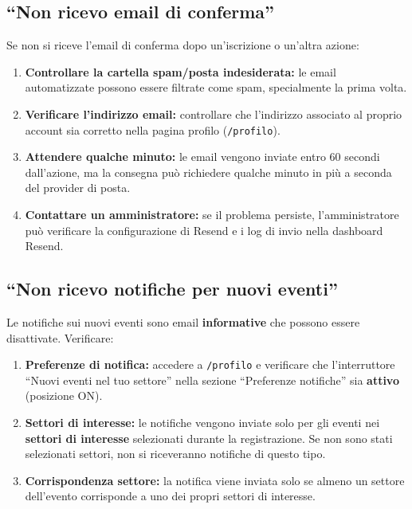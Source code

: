 \documentclass[a4paper,11pt,oneside]{book}
\newcommand{\percorso}[1]{\textcolor{namoCyan}{\texttt{#1}}}
\begin{document}
\subsection{``Non ricevo email di conferma''}

Se non si riceve l'email di conferma dopo un'iscrizione o un'altra azione:

\begin{enumerate}[leftmargin=1.5em]
  \item \textbf{Controllare la cartella spam/posta indesiderata:} le email automatizzate possono essere filtrate come spam, specialmente la prima volta.
  \item \textbf{Verificare l'indirizzo email:} controllare che l'indirizzo associato al proprio account sia corretto nella pagina profilo (\percorso{/profilo}).
  \item \textbf{Attendere qualche minuto:} le email vengono inviate entro 60 secondi dall'azione, ma la consegna pu\`o richiedere qualche minuto in pi\`u a seconda del provider di posta.
  \item \textbf{Contattare un amministratore:} se il problema persiste, l'amministratore pu\`o verificare la configurazione di Resend e i log di invio nella dashboard Resend.
\end{enumerate}

\subsection{``Non ricevo notifiche per nuovi eventi''}

Le notifiche sui nuovi eventi sono email \textbf{informative} che possono essere disattivate. Verificare:

\begin{enumerate}[leftmargin=1.5em]
  \item \textbf{Preferenze di notifica:} accedere a \percorso{/profilo} e verificare che l'interruttore ``Nuovi eventi nel tuo settore'' nella sezione ``Preferenze notifiche'' sia \textbf{attivo} (posizione ON).
  \item \textbf{Settori di interesse:} le notifiche vengono inviate solo per gli eventi nei \textbf{settori di interesse} selezionati durante la registrazione. Se non sono stati selezionati settori, non si riceveranno notifiche di questo tipo.
  \item \textbf{Corrispondenza settore:} la notifica viene inviata solo se almeno un settore dell'evento corrisponde a uno dei propri settori di interesse.
\end{enumerate}
\end{document}
